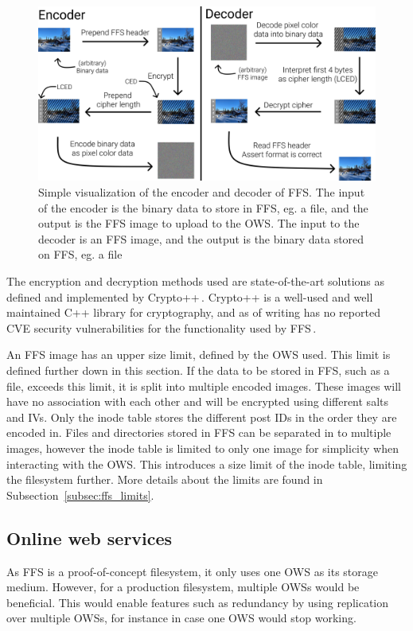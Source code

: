 \begin{figure}[!ht]
	\begin{center}
	  \includegraphics[width=1.0\textwidth]{figures/encoder_decoder.png}
	\end{center}
	\caption[Simple visualization of the encoder and decoder of FFS]{Simple visualization of the encoder and decoder of FFS. The input of the encoder is the binary data to store in FFS, eg. a file, and the output is the FFS image to upload to the OWS. The input to the decoder is an FFS image, and the output is the binary data stored on FFS, eg. a file}
	\label{fig:file_enc_dec}
\end{figure}

The encryption and decryption methods used are state-of-the-art solutions as defined and implemented by Crypto++\,\cite{CryptoLibraryFree}. Crypto++ is a well-used and well maintained C++ library for cryptography, and as of writing has no reported CVE security vulnerabilities for the functionality used by FFS\,\cite{CryptoppSecurityVulnerabilities}.

An FFS image has an upper size limit, defined by the OWS used. This limit is defined further down in this section. If the data to be stored in FFS, such as a file, exceeds this limit, it is split into multiple encoded images. These images will have no association with each other and will be encrypted using different salts and IVs. Only the inode table stores the different post IDs in the order they are encoded in. Files and directories stored in FFS can be separated in to multiple images, however the inode table is limited to only one image for simplicity when interacting with the OWS. This introduces a size limit of the inode table, limiting the filesystem further. More details about the limits are found in Subsection~\ref{subsec:ffs_limits}.

\subsection{Online web services}
As FFS is a proof-of-concept filesystem, it only uses one OWS as its storage medium. However, for a production filesystem, multiple OWSs would be beneficial. This would enable features such as redundancy by using replication over multiple OWSs, for instance in case one OWS would stop working.

